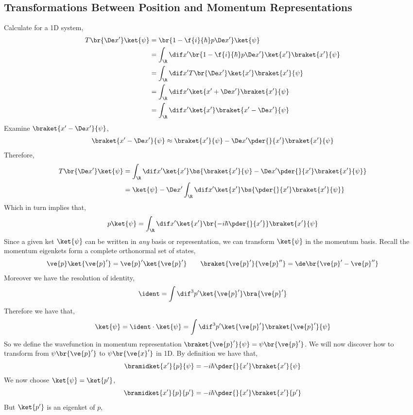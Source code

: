 \documentclass{article}
\begin{document}
\subsection{Transformations Between Position and Momentum Representations}
Calculate for a 1D system,
\begin{align*}
    T\br{\De x'}\ket{\psi} &= \br{1 - \f{i}{\hbar} p \De x'}\ket{\psi}\\
    &= \int_{\R} \dif x' \br{1 - \f{i}{\hbar} p \De x'}\ket{x'}\braket{x'}{\psi}\\
    &= \int_{\R} \dif x' T\br{\De x'}\ket{x'}\braket{x'}{\psi}\\
    &= \int_{\R} \dif x'\ket{x' + \De x'}\braket{x'}{\psi}\\
    &= \int_{\R} \dif x'\ket{x'}\braket{x' - \De x'}{\psi}
\end{align*}
Examine $\braket{x' - \De x'}{\psi}$,
\begin{align*}
    \braket{x' - \De x'}{\psi} \approx \braket{x'}{\psi} - \De x' \pder{}{x'}\braket{x'}{\psi}
\end{align*}
Therefore,
\begin{align*}
    T\br{\De x'}\ket{\psi} &= \int_{\R} \dif x'\ket{x'}\bs{\braket{x'}{\psi} - \De x' \pder{}{x'}\braket{x'}{\psi}} \\
    &= \ket{\psi} - \De x' \int_{\R} \dif x'\ket{x'}\bs{ \pder{}{x'}\braket{x'}{\psi}} \\
\end{align*}
Which in turn implies that,
\[ p \ket{\psi} = \int_{\R} \dif x'\ket{x'}\br{-i\hbar \pder{}{x'}}\braket{x'}{\psi} \]
Since a given ket $\ket{\psi}$ can be written in \textit{any} basis or representation, we can transform $\ket{\psi}$ in the momentum basis. Recall the momentum eigenkets form a complete orthonormal set of states,
\[ \ve{p} \ket{\ve{p}'} = \ve{p}'\ket{\ve{p}'} \qquad \braket{\ve{p}'}{\ve{p}''} = \de\br{\ve{p}' - \ve{p}''} \]
Moreover we have the resolution of identity,
\[ \ident = \int \dif^3 p' \ket{\ve{p}'}\bra{\ve{p}'} \]
Therefore we have that,
\[ \ket{\psi} = \ident \cdot \ket{\psi} = \int \dif^3 p' \ket{\ve{p}'}\braket{\ve{p}'}{\psi} \]
So we define the wavefunction in momentum representation $\braket{\ve{p}'}{\psi} = \psi\br{\ve{p}'}$. We will now discover how to transform from $\psi\br{\ve{p}'}$ to $\psi\br{\ve{x}'}$ in 1D. By definition we have that,
\[ \bramidket{x'}{p}{\psi} = - i \hbar \pder{}{x'} \braket{x'}{\psi} \]
We now choose $\ket{\psi} = \ket{p'}$,
\[ \bramidket{x'}{p}{p'} = - i \hbar \pder{}{x'} \braket{x'}{p'} \]
But $\ket{p'}$ is an eigenket of $p$,
\end{document}
